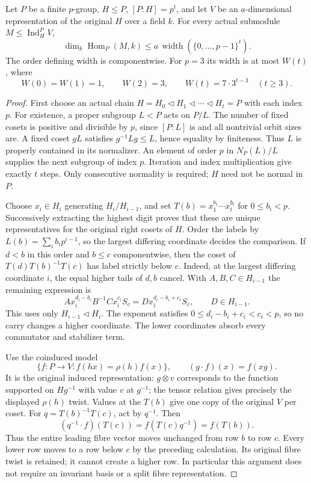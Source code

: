 \begin{lemma}\label{lem:ordered-transversal-head}
Let $P$ be a finite $p$-group, $H\leq P$, $[P:H]=p^t$, and let
$V$ be an $a$-dimensional representation of the original $H$ over a
field $k$. For every actual submodule $M\leq\operatorname{Ind}_H^P V$,
\[
 \dim_k\operatorname{Hom}_P(M,k)\leq
 a\,\operatorname{width}(\{0,\ldots,p-1\}^t).
\]
The order defining width is componentwise. For $p=3$ its width is at
most $W(t)$, where
\[
 W(0)=W(1)=1,\qquad W(2)=3,\qquad
 W(t)=7\cdot3^{t-3}\quad(t\geq3).
\]
\end{lemma}
\begin{proof}
First choose an actual chain
$H=H_0\lhd H_1\lhd\cdots\lhd H_t=P$ with each index $p$.
For existence, a proper subgroup $L<P$ acts on $P/L$. The number of
fixed cosets is positive and divisible by $p$, since $[P:L]$ is
and all nontrivial orbit sizes are. A fixed coset $gL$ satisfies
$g^{-1}Lg\leq L$, hence equality by finiteness. Thus $L$ is
properly contained in its normalizer. An element of order $p$ in
$N_P(L)/L$ supplies the next subgroup of index $p$. Iteration and
index multiplication give exactly $t$ steps. Only consecutive
normality is required; $H$ need not be normal in $P$.

Choose $x_i\in H_i$ generating $H_i/H_{i-1}$, and set
$T(b)=x_1^{b_1}\cdots x_t^{b_t}$ for $0\leq b_i<p$.
Successively extracting the highest digit proves that these are unique
representatives for the original right cosets of $H$. Order the labels
by $L(b)=\sum_i b_ip^{i-1}$, so the largest differing coordinate decides
the comparison. If $d<b$ in this order and $b\leq c$ componentwise,
then the coset of $T(d)T(b)^{-1}T(c)$ has label strictly below $c$.
Indeed, at the largest differing coordinate $i$, the equal higher tails
of $d,b$ cancel. With $A,B,C\in H_{i-1}$ the remaining expression is
\[
 A x_i^{d_i-b_i}B^{-1}C x_i^{c_i}S_c
   =D x_i^{d_i-b_i+c_i}S_c,\qquad D\in H_{i-1}.
\]
This uses only $H_{i-1}\lhd H_i$. The exponent satisfies
$0\leq d_i-b_i+c_i<c_i<p$, so no carry changes a higher coordinate.
The lower coordinates absorb every commutator and stabilizer term.

Use the coinduced model
\[
 \{f:P\to V:f(hx)=\rho(h)f(x)\},\qquad
 (g\cdot f)(x)=f(xg).
\]
It is the original induced representation: $g\otimes v$ corresponds
to the function supported on $Hg^{-1}$ with value $v$ at $g^{-1}$;
the tensor relation gives precisely the displayed $\rho(h)$ twist.
Values at the $T(b)$ give one copy of the original $V$ per coset.
For $q=T(b)^{-1}T(c)$, act by $q^{-1}$. Then
\[
 (q^{-1}\cdot f)(T(c))=f(T(c)q^{-1})=f(T(b)).
\]
Thus the entire leading fibre vector moves unchanged from row $b$ to
row $c$. Every lower row moves to a row below $c$ by the preceding
calculation. Its original fibre twist is retained; it cannot create a
higher row. In particular this argument does not require an invariant
basis or a split fibre representation.


\end{proof}
